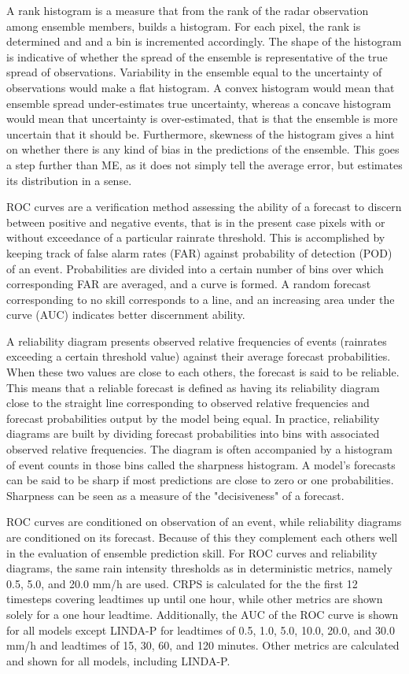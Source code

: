 A rank histogram is a measure that from the rank of the radar observation among ensemble members, builds a histogram. For each pixel, the rank is determined and and a bin is incremented accordingly. The shape of the histogram is indicative of  whether the spread of the ensemble is representative of the true spread of observations. Variability in the ensemble equal to the uncertainty of observations would make a flat histogram. A convex histogram would mean that ensemble spread under-estimates true uncertainty, whereas a concave histogram would mean that uncertainty is over-estimated, that is that the ensemble is more uncertain that it should be. Furthermore, skewness of the histogram gives a hint on whether there is any kind of bias in the predictions of the ensemble. This goes a step further than ME, as it does not simply tell the average error, but estimates its distribution in a sense. 


ROC curves \cite{mason1982model} are a verification method assessing the ability of a forecast to discern between positive and negative events, that is in the present case pixels with or without exceedance of a particular rainrate threshold. This is accomplished by keeping track of false alarm rates (FAR) against probability of detection (POD) of an event. Probabilities are divided into a certain number of bins over which corresponding FAR are averaged, and a curve is formed. A random forecast corresponding to no skill corresponds to a line, and an increasing area under the curve (AUC) indicates better discernment ability.

A reliability diagram presents observed relative frequencies of events (rainrates exceeding a certain threshold value) against their average forecast probabilities. When these two values are close to each others, the forecast is said to be reliable. This means that a reliable forecast is defined as having its reliability diagram close to the straight line corresponding to observed relative frequencies and forecast probabilities output by the model being equal. In practice, reliability diagrams are built by dividing forecast probabilities into bins with associated observed relative frequencies. The diagram is often accompanied by a histogram of event counts in those bins called the sharpness histogram. A model's forecasts can be said to be sharp if most predictions are close to zero or one probabilities. Sharpness can be seen as a measure of the "decisiveness" of a forecast.

ROC curves are conditioned on observation of an event, while reliability diagrams are conditioned on its forecast. Because of this they complement each others well in the evaluation of ensemble prediction skill. For ROC curves and reliability diagrams, the same rain intensity thresholds as in deterministic metrics, namely 0.5, 5.0, and 20.0 mm/h are used. CRPS is calculated for the the first 12 timesteps covering leadtimes up until one hour, while other metrics are shown solely for a one hour leadtime. Additionally, the AUC of the ROC curve is shown for all models except LINDA-P for leadtimes of 0.5, 1.0, 5.0, 10.0, 20.0, and 30.0 mm/h and leadtimes of 15, 30, 60, and 120 minutes. Other metrics are calculated and shown for all models, including LINDA-P.

